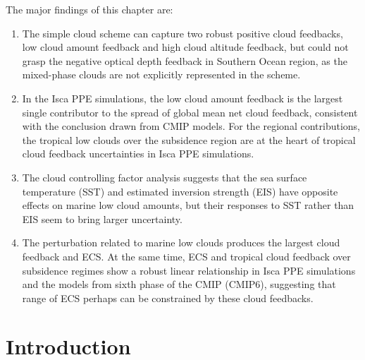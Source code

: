 The major findings of this chapter are:
\begin{enumerate}
    \item The simple cloud scheme can capture two robust positive cloud feedbacks, low cloud amount feedback and high cloud altitude feedback, but could not grasp the negative optical depth feedback in Southern Ocean region, as the mixed-phase clouds are not explicitly represented in the scheme.
    \item In the Isca PPE simulations, the low cloud amount feedback is the largest single contributor to the spread of global mean net cloud feedback, consistent with the conclusion drawn from CMIP models. For the regional contributions, the tropical low clouds over the subsidence region are at the heart of tropical cloud feedback uncertainties in Isca PPE simulations.
    \item The cloud controlling factor analysis suggests that the sea surface temperature (SST) and estimated inversion strength (EIS) have opposite effects on marine low cloud amounts, but their responses to SST rather than EIS seem to bring larger uncertainty.
    \item The perturbation related to marine low clouds produces the largest cloud feedback and ECS. At the same time, ECS and tropical cloud feedback over subsidence regimes show a robust linear relationship in Isca PPE simulations and the models from sixth phase of the CMIP (CMIP6), suggesting that range of ECS perhaps can be constrained by these cloud feedbacks.
\end{enumerate}

\section{Introduction}
\label{sec:cld_fbk_chap_intro}

